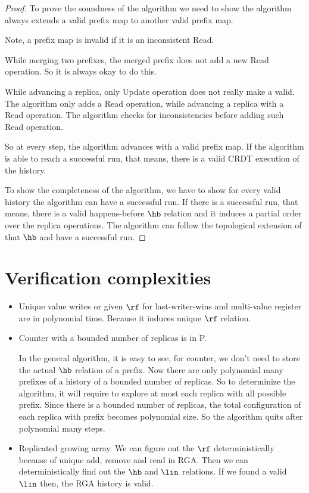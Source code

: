 \begin{proof}
 To prove the soundness of the algorithm we need to show the algorithm always extends a valid prefix map to another valid prefix map.

 Note, a prefix map is invalid if it is an inconsistent Read.

 While merging two prefixes, the merged prefix does not add a new Read operation. So it is always okay to do this.

 While advancing a replica, only Update operation does not really make a valid. The algorithm only adds a Read operation, while advancing a replica with a Read operation. The algorithm checks for inconsistencies before adding such Read operation.

 So at every step, the algorithm advances with a valid prefix map. If the algorithm is able to reach a successful run, that means, there is a valid CRDT execution of the history.

 To show the completeness of the algorithm, we have to show for every valid history the algorithm can have a successful run. If there is a successful run, that means, there is a valid happens-before $\hb$ relation and it induces a partial order over the replica operations. The algorithm can follow the topological extension of that $\hb$ and have a successful run.
\end{proof}


\section{Verification complexities}

\begin{itemize}
 \item Unique value writes or given $\rf$ for last-writer-wins and multi-value register are in polynomial time. Because it induces unique $\rf$ relation.

 \item Counter with a bounded number of replicas is in P.

    In the general algorithm, it is easy to see, for counter, we don't need to store the actual $\hb$ relation of a prefix. Now there are only polynomial many prefixes of a history of a bounded number of replicas. So to determinize the algorithm, it will require to explore at most each replica with all possible prefix. Since there is a bounded number of replicas, the total configuration of each replica with prefix becomes polynomial size. So the algorithm quits after polynomial many steps.

 \item Replicated growing array. We can figure out the $\rf$ deterministically because of unique add, remove and read in RGA. Then we can deterministically find out the $\hb$ and $\lin$ relations. If we found a valid $\lin$ then, the RGA history is valid.
\end{itemize}

